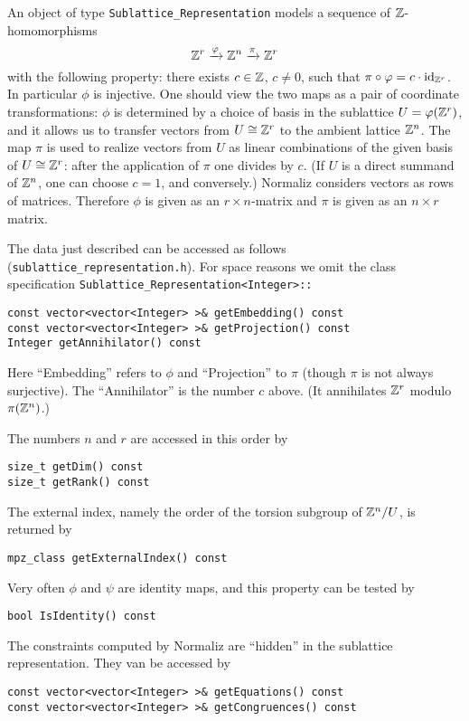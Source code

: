 \begin{small}
An object of type \verb|Sublattice_Representation| models a sequence of ${\mathbb Z}$-homomorphisms
$$
{\mathbb Z}^r\xrightarrow{\varphi}{\mathbb Z}^n\xrightarrow{\pi}{\mathbb Z}^r
$$
with the following property: there exists $c\in{\mathbb Z}$, $c\neq 0$, such that $\pi\circ \varphi=c\cdot\operatorname{id}_{{\mathbb Z}^r}$. In particular $\phi$ is injective. One should view the two maps as a pair of coordinate transformations: $\phi$ is determined by a choice of basis in the sublattice $U=\varphi({\mathbb Z}^r)$, and it allows us to transfer vectors from $U\cong {\mathbb Z}^r$ to the ambient lattice ${\mathbb Z}^n$. The map $\pi$ is used to realize vectors from $U$ as linear combinations of the given basis of $U\cong{\mathbb Z}^r$: after the application of $\pi$ one divides by $c$. (If $U$ is a direct summand of ${\mathbb Z}^n$, one can choose $c=1$, and conversely.) Normaliz considers vectors as rows of matrices. Therefore $\phi$ is given as an $r\times n$-matrix and $\pi$ is given as an $n\times r$ matrix.

The data just described can be accessed as follows (\verb|sublattice_representation.h|). For space reasons we omit the class specification \verb|Sublattice_Representation<Integer>::|
\begin{Verbatim}
const vector<vector<Integer> >& getEmbedding() const
const vector<vector<Integer> >& getProjection() const
Integer getAnnihilator() const
\end{Verbatim}
Here ``Embedding'' refers to $\phi$ and ``Projection'' to $\pi$ (though $\pi$ is not always surjective). The ``Annihilator'' is the number $c$ above. (It annihilates ${\mathbb Z}^r$ modulo $\pi({\mathbb Z}^n)$.)

The numbers $n$ and $r$ are accessed in this order by
\begin{Verbatim}
size_t getDim() const
size_t getRank() const
\end{Verbatim}
The external index, namely the order of the torsion subgroup of ${\mathbb Z}^n/U$, is returned by
\begin{Verbatim}
mpz_class getExternalIndex() const
\end{Verbatim}
Very often $\phi$ and $\psi$ are identity maps, and this property can be tested by
\begin{Verbatim}
bool IsIdentity() const
\end{Verbatim}
The constraints computed by Normaliz are ``hidden'' in the sublattice representation. They van be accessed by
\begin{Verbatim}
const vector<vector<Integer> >& getEquations() const
const vector<vector<Integer> >& getCongruences() const
\end{Verbatim}


\end{small}
